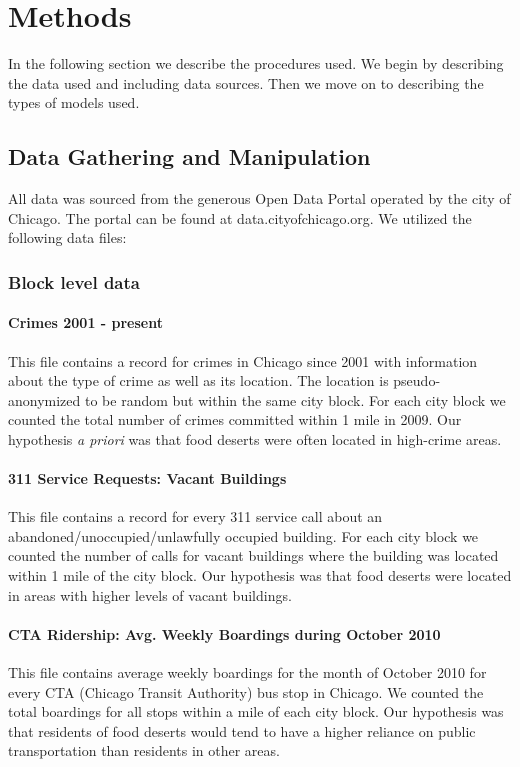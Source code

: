 \documentclass{report}
\begin{document}
\section*{Methods}
In the following section we describe the procedures used. We begin by describing the data used and including data sources. Then we move on to describing the types of models used. 

\subsection*{Data Gathering and Manipulation}

All data was sourced from the generous Open Data Portal operated by the city of Chicago. The portal can be found at data.cityofchicago.org. We utilized the following data files:

\subsubsection*{Block level data}

\paragraph{ Crimes 2001 - present}
This file contains a record for crimes in Chicago since 2001 with information about the type of crime as well as its location. The location is pseudo-anonymized to be random but within the same city block. For each city block we counted the total number of crimes committed within 1 mile in 2009. Our hypothesis \textit{a priori} was that food deserts were often located in high-crime areas.


\paragraph{ 311 Service Requests: Vacant Buildings}
This file contains a record for every 311 service call about an abandoned/unoccupied/unlawfully occupied building. For each city block we counted the number of calls for vacant buildings where the building was located within 1 mile of the city block. Our hypothesis was that food deserts were located in areas with higher levels of vacant buildings. 

\paragraph{ CTA Ridership: Avg. Weekly Boardings during October 2010}
This file contains average weekly boardings for the month of October 2010 for every CTA (Chicago Transit Authority) bus stop in Chicago. We counted the total boardings for all stops within a mile of each city block. Our hypothesis was that residents of food deserts would tend to have a higher reliance on public transportation than residents in other areas. 
\end{document}
